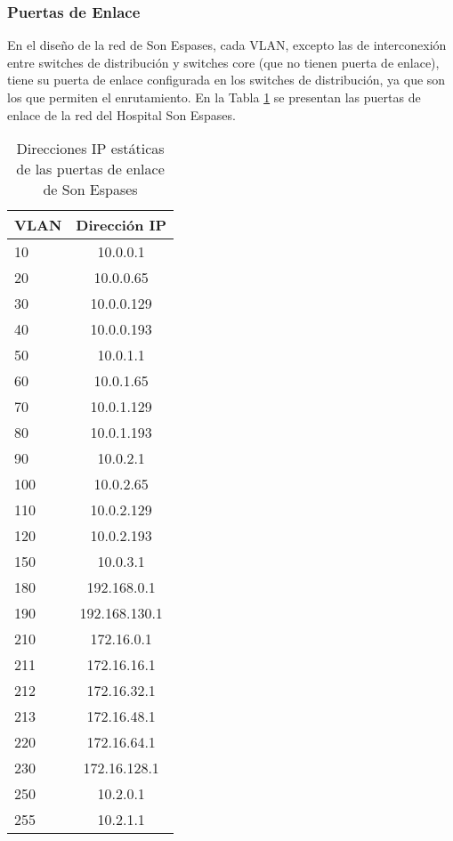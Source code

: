 \subsubsection{Puertas de Enlace}
En el diseño de la red de Son Espases, cada VLAN, excepto las de interconexión entre switches de distribución y switches core (que no tienen puerta de enlace), tiene su puerta de enlace configurada en los switches de distribución, ya que son los que permiten el enrutamiento. En la Tabla \ref{tab:GatewaysSE} se presentan las puertas de enlace de la red del Hospital Son Espases.
\begin{table}[H]
    \centering
    \scriptsize
    \begin{tabular}{|l|c|}
        \hline
        \textbf{VLAN} & \textbf{Dirección IP} \\
        \hline
        10 & 10.0.0.1 \\
        \hline
        20 & 10.0.0.65 \\
        \hline
        30 & 10.0.0.129 \\
        \hline
        40 & 10.0.0.193 \\
        \hline
        50 & 10.0.1.1 \\
        \hline
        60 & 10.0.1.65 \\
        \hline
        70 & 10.0.1.129 \\
        \hline
        80 & 10.0.1.193 \\
        \hline
        90 & 10.0.2.1 \\
        \hline
        100 & 10.0.2.65 \\
        \hline
        110 & 10.0.2.129 \\
        \hline
        120 & 10.0.2.193 \\
        \hline
        150 & 10.0.3.1 \\
        \hline
        180 & 192.168.0.1 \\
        \hline
        190 & 192.168.130.1 \\
        \hline
        210 & 172.16.0.1 \\
        \hline
        211 & 172.16.16.1 \\
        \hline
        212 & 172.16.32.1 \\
        \hline
        213 & 172.16.48.1 \\
        \hline
        220 & 172.16.64.1 \\
        \hline
        230 & 172.16.128.1 \\
        \hline
        250 & 10.2.0.1 \\
        \hline
        255 & 10.2.1.1 \\
        \hline
    \end{tabular}
    \caption{Direcciones IP estáticas de las puertas de enlace de Son Espases}
    \label{tab:GatewaysSE}
\end{table}

